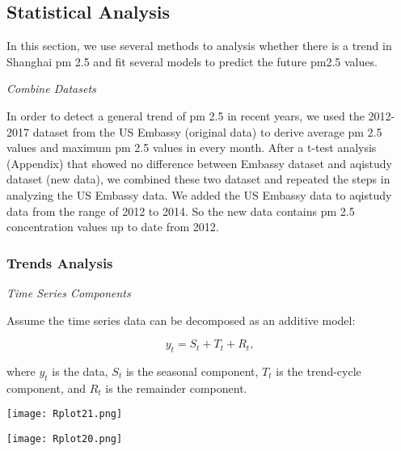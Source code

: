 \documentclass[11pt,]{article}
\begin{document}
\subsection{Statistical Analysis}

In this section, we use several methods to analysis whether there is a trend in Shanghai pm 2.5 and fit several models to predict the future pm2.5 values.

\vspace{3mm}

\noindent\emph{Combine Datasets}

\vspace{3mm}

In order to detect a general trend of pm 2.5 in recent years, we used the 2012-2017 dataset from the US Embassy (original data) to derive average pm 2.5 values and maximum pm 2.5 values in every month. After a t-test analysis (Appendix) that showed no difference between Embassy dataset and aqistudy dataset (new data), we combined these two dataset and repeated the steps in analyzing the US Embassy data. We added the US Embassy data to aqistudy data from the range of 2012 to 2014. So the new data contains pm 2.5 concentration values up to date from 2012.

\subsubsection{Trends Analysis}

\vspace{3mm}

\noindent\emph{Time Series Components}

\vspace{3mm}

Assume the time series data can be decomposed as an additive model:

$$
y_{t}=S_{t}+T_{t}+R_{t},
$$

where $y_t$ is the data, $S_t$ is the seasonal component, $T_t$ is the trend-cycle component, and $R_t$ is the remainder component.

\vspace{3mm}

\begin{minipage}{.45\linewidth}
\begin{flushleft}

{\texttt{[image: Rplot21.png]}}

\end{flushleft} 
\end{minipage}
\hfill
\begin{minipage}{.45\linewidth}
\begin{flushright} 

{\texttt{[image: Rplot20.png]}}

\end{flushright} 
\end{minipage}
\end{document}
